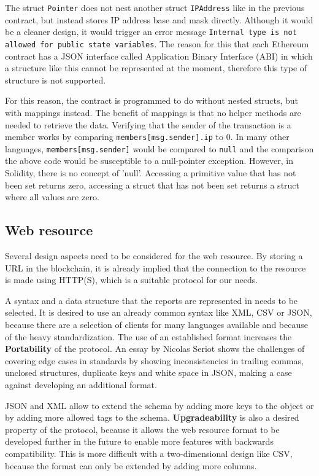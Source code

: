 The struct \texttt{Pointer} does not nest another struct \texttt{IPAddress} like in the previous contract, but instead stores IP address base and mask directly. Although it would be a cleaner design, it would trigger an error message \texttt{Internal type is not allowed for public state variables}. The reason for this that each Ethereum contract has a JSON interface called Application Binary Interface (ABI) in which a structure like this cannot be represented at the moment, therefore this type of structure is not supported.

For this reason, the contract is programmed to do without nested structs, but with mappings instead. The benefit of mappings is that no helper methods are needed to retrieve the data.
Verifying that the sender of the transaction is a member works by comparing \texttt{members[msg.sender].ip} to 0. In many other languages, \texttt{members[msg.sender]} would be compared to \texttt{null} and the comparison the above code would be susceptible to a null-pointer exception. However, in Solidity, there is no concept of 'null'. Accessing a primitive value that has not been set returns zero, accessing a struct that has not been set returns a struct where all values are zero.

\subsection{Web resource}
Several design aspects need to be considered for the web resource. By storing a URL in the blockchain, it is already implied that the connection to the resource is made using HTTP(S), which is a suitable protocol for our needs.

A syntax and a data structure that the reports are represented in needs to be selected. It is desired to use an already common syntax like XML, CSV or JSON, because there are a selection of clients for many languages available and because of the heavy standardization. The use of an established format increases the \textbf{Portability} of the protocol. An essay by Nicolas Seriot \cite{ParsingJSON} shows the challenges of covering edge cases in standards by showing inconsistencies in trailing commas, unclosed structures, duplicate keys and white space in JSON, making a case against developing an additional format.

JSON and XML allow to extend the schema by adding more keys to the object or by adding more allowed tags to the schema. \textbf{Upgradeability} is also a desired property of the protocol, because it allows the web resource format to be developed further in the future to enable more features with backwards compatibility. This is more difficult with a two-dimensional design like CSV, because the format can only be extended by adding more columns.

